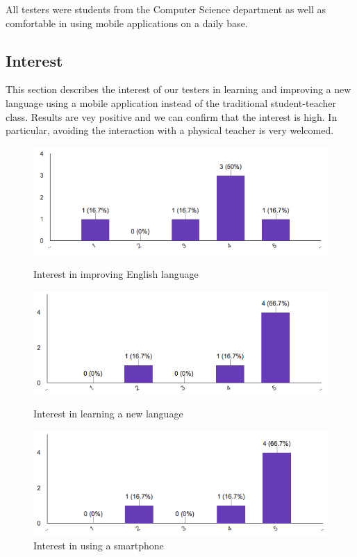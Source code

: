 \noindent All testers were students from the Computer Science department as well as comfortable in using mobile applications on a daily base.

\subsection*{Interest}
\label{sub:Interest}

This section describes the interest of our testers in learning and improving a new language using a mobile application instead of the traditional student-teacher class. Results are vey positive and we can confirm that the interest is high. In particular, avoiding the interaction with a physical teacher is very welcomed.

\begin{figure}[!ht]
	\centering
	\begin{minipage}{.5\textwidth}
		\centering
		\includegraphics[scale=0.5]{Figures/responses/interest_improving_lang.png}
		\caption{Interest in improving English language}
		\label{fig:int_improving_lang}
	\end{minipage}%
	\begin{minipage}{.5\textwidth}
		\centering
		\includegraphics[scale=0.5]{Figures/responses/interest_learning_language.png}
		\caption{Interest in learning a new language}
		\label{fig:int_learnign_lang}
	\end{minipage}
    \begin{minipage}{.5\textwidth}
        \centering
        \includegraphics[scale=0.5]{Figures/responses/interest_usage_smartphone.png}
        \caption{Interest in using a smartphone}
        \label{fig:int_usage_smartphone}
    \end{minipage}%
\end{figure}
